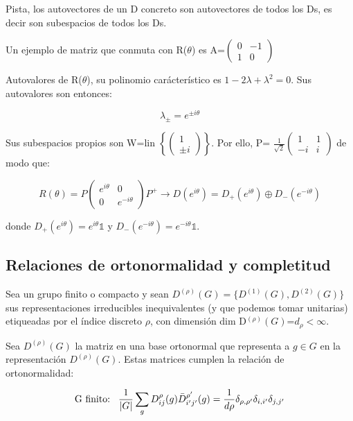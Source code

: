 \documentclass{article}
\begin{document}
\bigskip

Pista, los autovectores de un D concreto son autovectores de todos los Ds, es decir son subespacios de todos los Ds.

\bigskip
Un ejemplo de matriz que conmuta con R($\theta$) es A=$\left (\begin{array}{cc}
0 & -1 \\
1 & 0
\end{array} \right)$

Autovalores de R($\theta$), su polinomio carácterístico es $1-2\lambda +\lambda ^2=0$. Sus autovalores son entonces:

$$\lambda_\pm =e^{\pm i\theta}$$

Sus subespacios propios son W=lin $\left \lbrace \left ( \begin{array}{c}
1  \\
\pm i
\end{array}\right) \right\rbrace $.  Por ello, P= $ \frac{1}{\sqrt{2}}\left ( \begin{array}{cc}
1 & 1 \\
-i & i
\end{array}\right) $ de modo que:

$$R(\theta)=P\left( \begin{array}{cc}
e^{i\theta} & 0 \\
0 & e^{-i\theta}
\end{array}\right)P^{+} \to D(e^{i\theta})=D_+(e^{i\theta})\oplus D_-(e^{-i\theta})$$

donde $D_+(e^{i\theta})=e^{i\theta}\mathds{1}$ y $D_-(e^{-i\theta})=e^{-i\theta}\mathds{1}$.

\subsection{Relaciones de ortonormalidad y completitud}

Sea un grupo finito o compacto y sean $D^{(\rho)}(G)=\lbrace D^{(1)}(G), D^{(2)}(G)\rbrace$ sus representaciones irreducibles inequivalentes (y que podemos tomar unitarias) etiqueadas por el índice discreto $\rho$, con dimensión dim D$^{(\rho)}(G)$=$d_\rho <\infty$.

Sea $D^{(\rho)}(G)$ la matriz en una base ortonormal que representa a $g\in G$ en la representación $D^{(\rho )}(G)$. Estas matrices cumplen la relación de ortonormalidad:

$$\text{G finito:} \hspace{0.3cm} \frac{1}{|G|}\sum _g D_{ij}^\rho (g) \bar{D}_{i'j'}^{\rho '}(g)=\frac{1}{d \rho}\delta _{\rho , \rho '}\delta _{i, i'}\delta _{j,j'}$$
\end{document}
